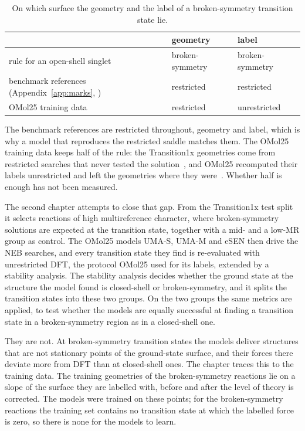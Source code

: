 \begin{table}[h]
\centering
\small
\caption{On which surface the geometry and the label of a
broken-symmetry transition state lie.}
\label{tab:surfaces}
\begin{tabular}{@{}lll@{}}
\toprule
 & geometry & label \\
\midrule
rule for an open-shell singlet & broken-symmetry & broken-symmetry \\
benchmark references (Appendix~\ref{app:marks}, \cite{hait2025, marks2026}) & restricted & restricted \\
OMol25 training data~\cite{omol25} & restricted & unrestricted \\
\bottomrule
\end{tabular}
\end{table}

The benchmark references are restricted throughout, geometry and label,
which is why a model that reproduces the restricted saddle matches them.
The OMol25 training data keeps half of the rule: the Transition1x
geometries come from restricted searches that never tested the
solution~\cite{schreiner2022}, and OMol25 recomputed their labels
unrestricted and left the geometries where they were~\cite{omol25}.
Whether half is enough has not been measured.

The second chapter attempts to close that gap. From the Transition1x
test split it selects reactions of high multireference character,
where broken-symmetry solutions are expected at the transition state,
together with a mid- and a low-MR group as control. The OMol25 models
UMA-S, UMA-M and eSEN then drive the NEB searches, and every transition
state they find is re-evaluated with unrestricted DFT, the protocol
OMol25 used for its labels, extended by a stability analysis. The
stability analysis decides whether the ground state at the structure
the model found is closed-shell or broken-symmetry, and it splits the
transition states into these two groups. On the two groups the same
metrics are applied, to test whether the models are equally successful
at finding a transition state in a broken-symmetry region as in a
closed-shell one.

They are not. At broken-symmetry transition states the models deliver
structures that are not stationary points of the ground-state surface,
and their forces there deviate more from DFT than at closed-shell ones.
The chapter traces this to the training data. The training geometries
of the broken-symmetry reactions lie on a slope of the surface they are
labelled with, before and after the level of theory is corrected. The
models were trained on these points; for the broken-symmetry reactions
the training set contains no transition state at which the labelled
force is zero, so there is none for the models to learn.
